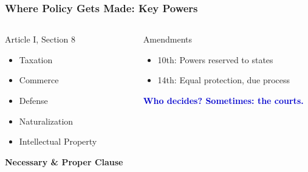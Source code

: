 \documentclass[10pt]{beamer}
\begin{document}
\begin{frame}
\frametitle{Where Policy Gets Made: Key Powers}

\begin{columns}
\begin{column}{0.48\textwidth}
\begin{block}{Article I, Section 8}
\pause
\begin{itemize}
\item Taxation
\item Commerce
\item Defense
\item Naturalization
\item Intellectual Property
\end{itemize}

\vspace{0.3cm}
\textcolor{titanblue}{\textbf{Necessary \& Proper Clause}}
\end{block}
\end{column}

\begin{column}{0.48\textwidth}
\begin{block}{Amendments}
\pause
\begin{itemize}
\item 10th: Powers reserved to states
\item 14th: Equal protection, due process
\end{itemize}

\vspace{0.3cm}
\textcolor{mediumblue}{\textbf{Who decides? Sometimes: the courts.}}
\end{block}
\end{column}
\end{columns}

\end{frame}
\end{document}
